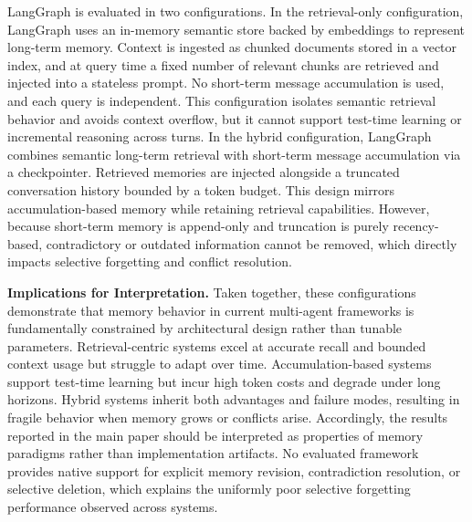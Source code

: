 LangGraph is evaluated in two configurations. In the retrieval-only configuration, LangGraph uses an in-memory semantic store backed by embeddings to represent long-term memory. Context is ingested as chunked documents stored in a vector index, and at query time a fixed number of relevant chunks are retrieved and injected into a stateless prompt. No short-term message accumulation is used, and each query is independent. This configuration isolates semantic retrieval behavior and avoids context overflow, but it cannot support test-time learning or incremental reasoning across turns. In the hybrid configuration, LangGraph combines semantic long-term retrieval with short-term message accumulation via a checkpointer. Retrieved memories are injected alongside a truncated conversation history bounded by a token budget. This design mirrors accumulation-based memory while retaining retrieval capabilities. However, because short-term memory is append-only and truncation is purely recency-based, contradictory or outdated information cannot be removed, which directly impacts selective forgetting and conflict resolution.

\textbf{Implications for Interpretation.}
Taken together, these configurations demonstrate that memory behavior in current multi-agent frameworks is fundamentally constrained by architectural design rather than tunable parameters. Retrieval-centric systems excel at accurate recall and bounded context usage but struggle to adapt over time. Accumulation-based systems support test-time learning but incur high token costs and degrade under long horizons. Hybrid systems inherit both advantages and failure modes, resulting in fragile behavior when memory grows or conflicts arise. Accordingly, the results reported in the main paper should be interpreted as properties of memory paradigms rather than implementation artifacts. No evaluated framework provides native support for explicit memory revision, contradiction resolution, or selective deletion, which explains the uniformly poor selective forgetting performance observed across systems.
